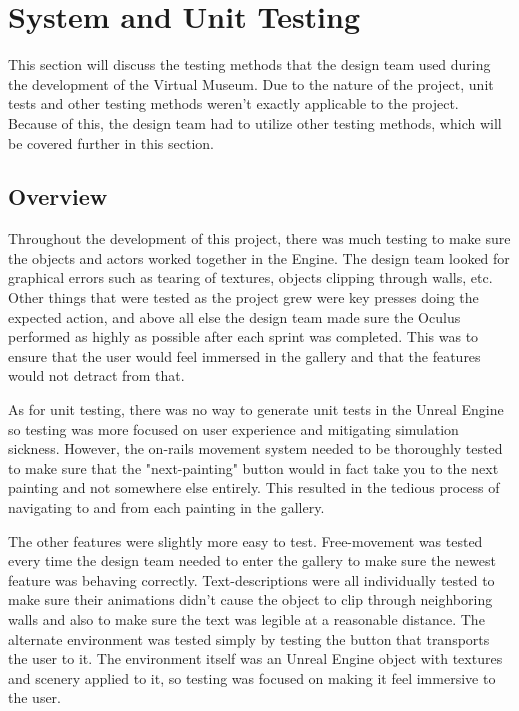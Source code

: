 

\chapter{System  and Unit Testing}

This section will discuss the testing methods that the design team used during the development of the Virtual Museum.  Due to the nature of the project, unit tests and other testing methods weren't exactly applicable to the project.  Because of this, the design team had to utilize other testing methods, which will be covered further in this section.

\section{Overview}
Throughout the development of this project, there was much testing to make sure the objects and actors worked together in the Engine.  The design team looked for graphical errors such as tearing of textures, objects clipping through walls, etc.  Other things that were tested as the project grew were key presses doing the expected action, and above all else the design team made sure the Oculus performed as highly as possible after each sprint was completed.  This was to ensure that the user would feel immersed in the gallery and that the features would not detract from that.  

As for unit testing, there was no way to generate unit tests in the Unreal Engine so testing was more focused on user experience and mitigating simulation sickness.  However, the on-rails movement system needed to be thoroughly tested to make sure that the "next-painting" button would in fact take you to the next painting and not somewhere else entirely.  This resulted in the tedious process of navigating to and from each painting in the gallery.

The other features were slightly more easy to test.  Free-movement was tested every time the design team needed to enter the gallery to make sure the newest feature was behaving correctly.  Text-descriptions were all individually tested to make sure their animations didn't cause the object to clip through neighboring walls and also to make sure the text was legible at a reasonable distance.  The alternate environment was tested simply by testing the button that transports the user to it.  The environment itself was an Unreal Engine object with textures and scenery applied to it, so testing was focused on making it feel immersive to the user.


